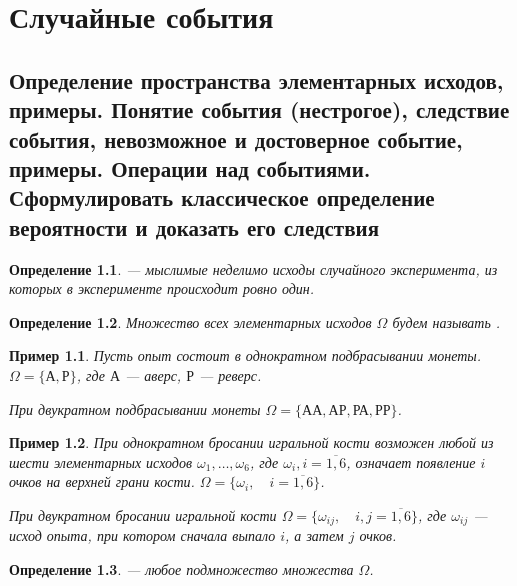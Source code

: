 \documentclass[a4paper]{report}
\theoremstyle{indented}
\newtheorem{definition}{Определение}[section]
\newtheorem{example}{Пример}[section]
\begin{document}
\chapter{Случайные события}

\section{Определение пространства элементарных исходов, примеры.
Понятие события (нестрогое), следствие события, невозможное и достоверное событие, примеры.
Операции над событиями.
Сформулировать классическое определение вероятности и доказать его следствия}

\begin{definition}
	\label{def:outcomes}
	 — мыслимые неделимо исходы случайного эксперимента, из которых в эксперименте происходит ровно один.
\end{definition}

\begin{definition}
	\label{def:sample-space}
	Множество всех элементарных исходов $\Omega$ будем называть .
\end{definition}

\begin{example}
	\label{xmp:sample-space-coin-toss}
	Пусть опыт состоит в однократном подбрасывании монеты.
	$\Omega = \{\text{А}, \text{Р}\}$, где $\text{А}$ — аверс, $\text{Р}$ — реверс.

	При двукратном подбрасывании монеты $\Omega = \{\text{АА}, \text{АР}, \text{РА}, \text{РР}\}$.
\end{example}

\begin{example}
	\label{xmp:sample-space-dice-toss}
	При однократном бросании игральной кости возможен любой из шести элементарных исходов $\omega_1, \dots, \omega_6$, где $\omega_i, i=\overline{1, 6}$, означает появление $i$ очков на верхней грани кости.
	$\Omega = \{\omega_i,\quad i = \overline{1, 6}\}$.

	При двукратном бросании игральной кости $\Omega = \{\omega_{ij},\quad i, j = \overline{1, 6}\}$, где $\omega_{ij}$ — исход опыта, при котором сначала выпало $i$, а затем $j$ очков.
\end{example}

\begin{definition}
	\label{def:event}
	 — любое подмножество множества $\Omega$.
\end{definition}
\end{document}
